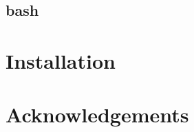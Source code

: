 \documentclass[11pt]{article}
\newcommand*\FancyVerbStartString{}
\newcommand*\FancyVerbStopString{}
\newcommand{\codepyt}[4]{%
  \refstepcounter{Listing}%
  \fvset{label=Listing~\theListing#4}%
  \fvset{gobble=#3}%
  \renewcommand*\FancyVerbStartString{\PY{c}{\PYZsh{}\PYZlt{}listing\PYZhy{}#2\PYZgt{}}}%
  \renewcommand*\FancyVerbStopString{\PY{c}{\PYZsh{}\PYZlt{}/listing\PYZhy{}#2\PYZgt{}}}%
  \vspace{-1.5em}%
}
\begin{document}
\subsection{bash}
 
  
\appendix

\section{Installation}\label{sec:install}

\section*{Acknowledgements}
\footnotesize

\renewcommand*{\bibfont}{\footnotesize}
\printbibliography
\end{document}
